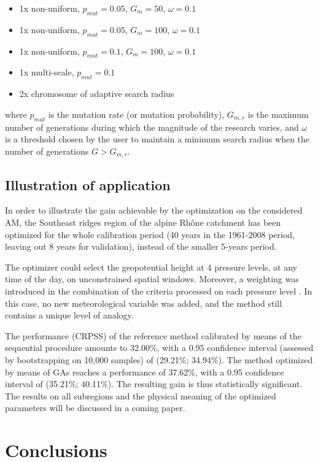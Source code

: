 \documentclass{ametsoc}
\begin{document}
\begin{itemize}
	\setlength\itemsep{-4px}
	\item 1x non-uniform, $p_{mut}=0.05$, $G_{m}=50$, $\omega=0.1$
	\item 1x non-uniform, $p_{mut}=0.05$, $G_{m}=100$, $\omega=0.1$
	\item 1x non-uniform, $p_{mut}=0.1$, $G_{m}=100$, $\omega=0.1$
	\item 1x multi-scale,  $p_{mut}=0.1$
	\item 2x chromosome of adaptive search radius
\end{itemize}

where $p_{mut}$ is the mutation rate (or mutation probability), $G_{m,r}$ is the maximum number of generations during which the magnitude of the research varies, and $\omega$ is a threshold chosen by the user to maintain a minimum search radius when the number of generations $G>G_{m,r}$.


\subsection{Illustration of application}

In order to illustrate the gain achievable by the optimization on the considered AM, the Southeast ridges region of the alpine Rhône catchment has been optimized for the whole calibration period (40 years in the 1961-2008 period, leaving out 8 years for validation), instead of the smaller 5-years period.

The optimizer could select the geopotential height at 4 pressure levels, at any time of the day, on unconstrained spatial windows. Moreover, a weighting was introduced in the combination of the criteria processed on each pressure level \citep[such as][]{Horton2012a, Junk2015}. In this case, no new meteorological variable was added, and the method still contains a unique level of analogy.

The performance (CRPSS) of the reference method calibrated by means of the sequential procedure amounts to 32.00\%, with a 0.95 confidence interval (assessed by bootstrapping on 10,000 samples) of (29.21\%; 34.94\%). The method optimized by means of GAs reaches a performance of 37.62\%, with a 0.95 confidence interval of (35.21\%; 40.11\%). The resulting gain is thus statistically significant. The results on all subregions and the physical meaning of the optimized parameters will be discussed in a coming paper.


\section{Conclusions}
\label{sec:conclusions}
\end{document}
